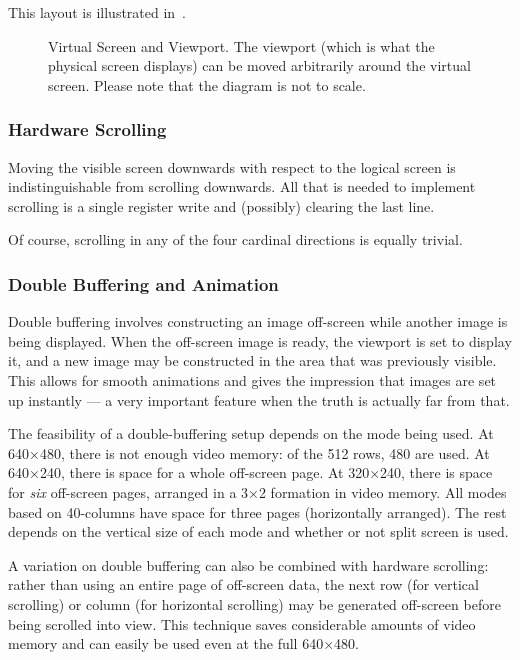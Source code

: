 This layout is illustrated in~.

\begin{figure}
 \centering
 \caption[Virtual Screen]{\label{fig:vdu-virtual-screen} Virtual Screen and
   Viewport. The viewport (which is what the physical screen displays) can be
   moved arbitrarily around the virtual screen. Please note that the diagram is not to scale.
 }
\end{figure}




\subsubsection{Hardware Scrolling}

Moving the visible screen downwards with respect to the logical screen is
indistinguishable from scrolling downwards. All that is needed to implement
scrolling is a single register write and (possibly) clearing the last line.

Of course, scrolling in any of the four cardinal directions is equally trivial.

\subsubsection{Double Buffering and Animation}

Double buffering involves constructing an image off-screen while another image
is being displayed. When the off-screen image is ready, the viewport is set to
display it, and a new image may be constructed in the area that was previously
visible. This allows for smooth animations and gives the impression that images
are set up instantly — a very important feature when the truth is actually far
from that.

The feasibility of a double-buffering setup depends on the mode being used. At
640×480, there is not enough video memory: of the 512 rows, 480 are used. At
640×240, there is space for a whole off-screen page. At 320×240, there is space
for {\em six\/} off-screen pages, arranged in a 3×2 formation in video
memory. All modes based on 40-columns have space for three pages (horizontally
arranged). The rest depends on the vertical size of each mode and whether or
not split screen is used.

A variation on double buffering can also be combined with hardware scrolling:
rather than using an entire page of off-screen data, the next row (for vertical
scrolling) or column (for horizontal scrolling) may be generated off-screen
before being scrolled into view. This technique saves considerable amounts of
video memory and can easily be used even at the full 640×480.

